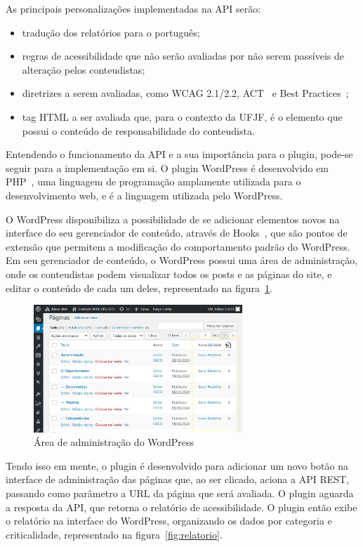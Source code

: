 \documentclass[
	article,			%
	12pt,				%
	oneside,			%
	a4paper,			%
	section=TITLE,		%
	subsection=TITLE,	%
	english,			%
	brazil,				%
	sumario=tradicional
	]{abntex2}
\begin{document}
As principais personalizações implementadas na API serão:
\begin{itemize}
\item tradução dos relatórios para o português; 
\item regras de acessibilidade que 
não serão avaliadas por não serem passíveis de alteração pelos conteudistas;
\item diretrizes a serem avaliadas, como WCAG 2.1/2.2, ACT~\cite{ACT} e Best
Practices~\cite{BP};
\item tag HTML a ser avaliada que, para o contexto da UFJF, é o elemento que possui o conteúdo de responsabilidade do conteudista.
\end{itemize}

Entendendo o funcionamento da API e a sua importância para o
plugin, pode-se seguir para a implementação em si. O plugin WordPress
é desenvolvido em PHP~\cite{php}, uma linguagem de programação amplamente utilizada
para o desenvolvimento web, e é a linguagem utilizada pelo WordPress.

O WordPress disponibiliza a possibilidade de se adicionar elementos novos na interface
do seu gerenciador de conteúdo, através de Hooks~\cite{hooks}, que são pontos
de extensão que permitem a modificação do comportamento padrão do WordPress. Em seu
gerenciador de conteúdo, o WordPress possui uma área de administração, onde
os conteudistas podem visualizar todos os posts e as páginas do site, e editar o conteúdo
de cada um deles, representado na figura~\ref{fig:wp-admin}.
\begin{figure}[h]
    \centering
    \caption{Área de administração do WordPress}
    \label{fig:wp-admin}
    \includegraphics[width=0.7\textwidth]{imagem1.png}
\end{figure}

Tendo isso em mente, o plugin é desenvolvido para adicionar um novo botão na
interface de administração das páginas que, ao ser clicado, aciona a API REST,
passando como parâmetro a URL da página que será avaliada. O plugin aguarda a resposta da API, 
que retorna o relatório de acessibilidade. O plugin
então exibe o relatório na interface do WordPress, organizando os dados
por categoria e criticalidade, representado na figura~\ref{fig:relatorio}.
\end{document}
